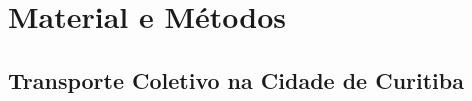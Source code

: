 

\chapter{Material e Métodos}\label{cap:materialemetodos}

\section{Transporte Coletivo na Cidade de Curitiba}


